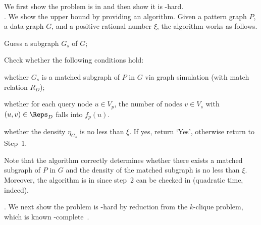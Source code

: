 We first show the problem is in \NP and then show it is \NP-hard.\\
.
We show the \NP upper bound by providing an \NP algorithm. Given a pattern graph $P$,
a data graph $G$, and a positive rational number $\xi$, the algorithm works as follows.
\be
\item Guess a subgraph $G_s$ of $G$;
\item Check whether the following conditions hold:
\bi
\item [(a)] whether $G_s$ is a matched subgraph of $P$ in $G$ via graph simulation (with match relation $R_D$);
\item [(b)] whether for each query node $u\in V_p$, the number of nodes $v\in V_s$ with $(u, v)\in \Reps_D$ falls into $f_p(u)$.
\item [(c)] whether the density $\eta_{G_s}$ is no less than $\xi$.
\ei
If yes, return `Yes', otherwise return to Step~1.
\ee

Note that the algorithm correctly determines whether there exists a matched subgraph of $P$ in $G$ and the density of the matched subgraph is no less than $\xi$. Moreover, the algorithm is in \NP since step~2 can be checked in \PTIME (quadratic time, indeed).

.
We next show the problem is \NP-hard by reduction from the $k$-clique problem, which is known \NP-complete~\cite{}.

